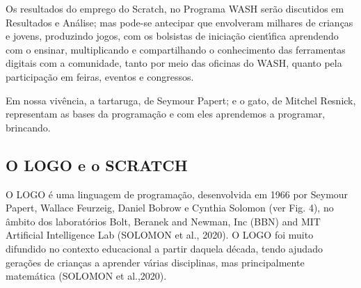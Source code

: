 \documentclass[
12pt,		%
openright,	%
twoside,  %
a4paper,			%
chapter=TITLE,		%
english,			%
french,				%
spanish,			%
brazil				%
]{USPSC-classe/USPSC}
\begin{document}
Os resultados do emprego do Scratch, no Programa WASH ser\~ao discutidos em Resultados e An\'alise; mas pode-se antecipar que envolveram milhares de crian\c{c}as e jovens, produzindo jogos, com os bolsistas de inicia\c{c}\~ao cient\'{\i}fica aprendendo com o ensinar, multiplicando e compartilhando o conhecimento das ferramentas digitais  com a comunidade, tanto por meio das oficinas do WASH, quanto pela participa\c{c}\~ao em feiras, eventos e congressos.

















Em nossa viv\^encia, a tartaruga, de Seymour Papert; e o gato, de Mitchel Resnick,  representam as bases da  programa\c{c}\~ao e com eles aprendemos a  programar, brincando.

















\subsection[O LOGO e o SCRATCH]{O LOGO e o SCRATCH}\label{O LOGO e o SCRATCH}
O LOGO \'e uma linguagem de programa\c{c}\~ao, desenvolvida em 1966 por Seymour Papert, Wallace Feurzeig, Daniel Bobrow e Cynthia Solomon (ver Fig. 4), no \^ambito dos laborat\'orios Bolt, Beranek and Newman, Inc (BBN) and MIT Artificial Intelligence Lab (SOLOMON et al., 2020). O LOGO foi muito difundido no contexto educacional a partir daquela d\'ecada, tendo ajudado gera\c{c}\~oes de crian\c{c}as a aprender v\'arias disciplinas, mas principalmente matem\'atica (SOLOMON et al.,2020).
\end{document}
